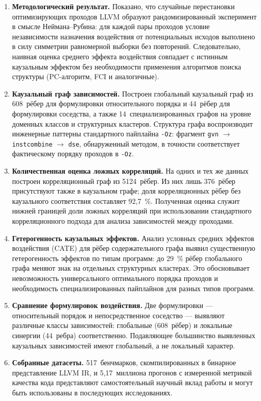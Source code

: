 \begin{enumerate}
    \item \textbf{Методологический результат.} Показано, что случайные перестановки оптимизирующих проходов LLVM образуют рандомизированный эксперимент в смысле Неймана--Рубина: для каждой пары проходов условие независимости назначения воздействия от потенциальных исходов выполнено в силу симметрии равномерной выборки без повторений. Следовательно, наивная оценка среднего эффекта воздействия совпадает с истинным каузальным эффектом без необходимости применения алгоритмов поиска структуры (PC-алгоритм, FCI и аналогичные).

    \item \textbf{Каузальный граф зависимостей.} Построен глобальный каузальный граф из 608~рёбер для формулировки относительного порядка и 44~рёбер для формулировки соседства, а также 14~специализированных графов на уровне доменных классов и структурных кластеров. Структура графа воспроизводит инженерные паттерны стандартного пайплайна \texttt{-Oz}: фрагмент \texttt{gvn} $\to$ \texttt{instcombine} $\to$ \texttt{dse}, обнаруженный методом, в точности соответствует фактическому порядку проходов в \texttt{-Oz}.

    \item \textbf{Количественная оценка ложных корреляций.} На одних и тех же данных построен корреляционный граф из 5124~рёбер. Из них лишь 376~рёбер присутствуют также в каузальном графе; доля корреляционных рёбер без каузального соответствия составляет 92{,}7~\%. Полученная оценка служит нижней границей доли ложных корреляций при использовании стандартного корреляционного подхода для анализа зависимостей между проходами.

    \item \textbf{Гетерогенность каузальных эффектов.} Анализ условных средних эффектов воздействия (CATE) для рёбер содержательного графа выявил существенную гетерогенность эффектов по типам программ: до 29~\% рёбер глобального графа меняют знак на отдельных структурных кластерах. Это обосновывает невозможность универсального оптимального порядка проходов и необходимость специализированных пайплайнов для разных типов программ.

    \item \textbf{Сравнение формулировок воздействия.} Две формулировки --- относительный порядок и непосредственное соседство --- выявляют различные классы зависимостей: глобальные (608~рёбер) и локальные синергии (44~ребра) соответственно. Подавляющее большинство выявленных каузальных зависимостей имеют глобальный, а не локальный характер.

    \item \textbf{Собранные датасеты.} 517~бенчмарков, скомпилированных в бинарное представление LLVM IR, и 5{,}17~миллиона прогонов с измеренной метрикой качества кода представляют самостоятельный научный вклад работы и могут быть использованы в последующих исследованиях.
\end{enumerate}

